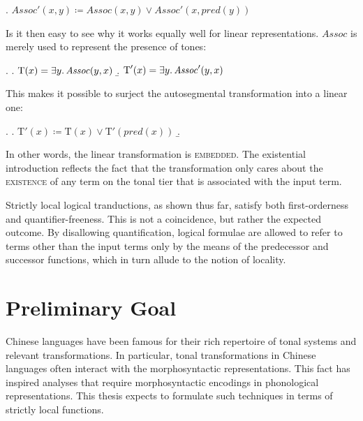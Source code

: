 \documentclass[12pt, a4paper]{report}
\newcommand{\textemph}[1]{\textsc{#1}}
\newcommand{\textterm}[1]{\textsc{#1}\index{#1}}
\begin{document}
\ex. \(\mathit{Assoc}'(x, y) \coloneq \mathit{Assoc}(x, y) \lor
\mathit{Assoc}'(x, \mathit{pred}(y))\)

Is it then easy to see why it works equally well for linear
representations.  \(\mathit{Assoc}\) is merely used to represent the
presence of tones:

\ex.
\a. \(\text{T}(x) = \exists y\ldotp \mathit{Assoc}(y, x)\)
\b. \(\text{T}'(x) = \exists y\ldotp \mathit{Assoc}'(y, x)\)

This makes it possible to surject the autosegmental transformation
into a linear one:

\ex.
\a. \(\text{T}'(x) \coloneq
\text{T}(x) \lor \text{T}'(\mathit{pred}(x))\)
\b.
\begin{prooftree}
\end{prooftree}

In other words, the linear transformation is \textterm{embedded}.  The
existential introduction reflects the fact that the transformation
only cares about the \textemph{existence} of any term on the tonal
tier that is associated with the input term.


Strictly local logical tranductions, as shown thus far, satisfy both
first-orderness and quantifier-freeness.  This is not a coincidence,
but rather the expected outcome.  By disallowing quantification,
logical formulae are allowed to refer to terms other than the input
terms only by the means of the predecessor and successor functions,
which in turn allude to the notion of locality.

\section{Preliminary Goal}
Chinese languages have been famous for their rich repertoire of tonal
systems and relevant transformations.  In particular, tonal
transformations in Chinese languages often interact with the
morphosyntactic representations.  This fact has inspired analyses that
require morphosyntactic encodings in phonological representations.
This thesis expects to formulate such techniques in terms of strictly
local functions.
\end{document}
